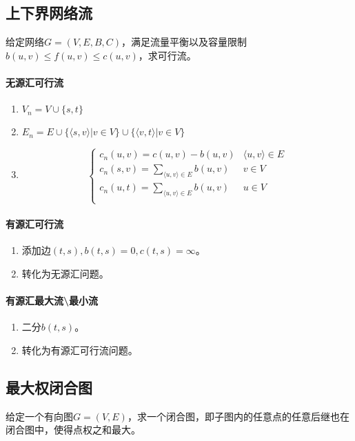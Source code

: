 \subsection*{上下界网络流}
给定网络$G=(V, E, B, C)$，满足流量平衡以及容量限制$b(u, v) \leq f(u, v) \leq c(u, v)$，求可行流。

\paragraph{无源汇可行流}
\begin{enumerate}
	\item $V_n=V \cup \{s, t\}$
	\item $E_n=E \cup \{\langle s, v \rangle |v\in V\} \cup \{\langle v, t \rangle|v\in V\}$
	\item \[ \begin{cases}
		c_n(u, v)=c(u, v)-b(u, v) &\langle u, v \rangle \in E \\
		c_n(s, v)=\sum\limits_{\langle u, v \rangle \in E} b(u, v) & v \in V \\
		c_n(u, t)=\sum\limits_{\langle u, v \rangle \in E} b(u, v) & u \in V \\
	\end{cases} \]
\end{enumerate}

\paragraph{有源汇可行流}
\begin{enumerate}
	\item 添加边$(t, s), b(t, s)=0, c(t, s)=\infty$。
	\item 转化为无源汇问题。
\end{enumerate}

\paragraph{有源汇最大流\textbackslash 最小流}
\begin{enumerate}
	\item 二分$b(t, s)$。
	\item 转化为有源汇可行流问题。
\end{enumerate}

\subsection*{最大权闭合图}
给定一个有向图$G=(V, E)$，求一个闭合图，即子图内的任意点的任意后继也在闭合图中，使得点权之和最大。

